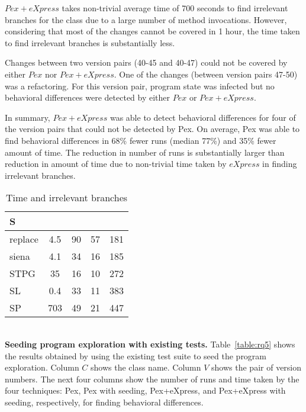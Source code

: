   $Pex+eXpress$ takes non-trivial average time of 700 seconds to find irrelevant branches for the class  due to a large number of method invocations. However, considering that most of the changes cannot be covered in 1 hour, the time taken to find irrelevant branches is substantially less. 
  
  Changes between two version pairs (40-45 and 40-47) could not be covered by either $Pex$ nor $Pex+eXpress$. One of the changes (between version pairs 47-50) was a refactoring. For this version pair, program state was infected but no behavioral differences were detected by either $Pex$ or $Pex+eXpress$.
   
  In summary, $Pex+eXpress$ was able to detect behavioral differences for four of the version pairs that could not be detected by Pex. On average, Pex was able to find behavioral differences in 68\% fewer runs (median 77\%) and 35\% fewer amount of time. 
  The reduction in number of runs is substantially larger than reduction in amount of time due to non-trivial time taken by 
  $eXpress$ in finding irrelevant branches.
\begin{table}
\begin{CodeOut}
\begin{center}
\caption {\label{table:all_time}\scriptsize{Time and irrelevant branches}}
\begin {tabular} {|l|c|c|c|c|}
\hline
S &\CenterCell{$T_{static}(s)$}&\CenterCell{$B_{E+I}$}&\CenterCell{$B_{P}$}&\CenterCell{$B_{Tot}$}\\
\hline
replace		&4.5							&90			&	57	&181\\
\hline
siena			&4.1							&34			&	16	&185\\
\hline
STPG			&35								&16			&	10	&272\\
\hline
SL				&0.4							&33			&	11	&383\\
\hline
SP				&703							&49			&	21	&447\\
\hline
\end{tabular}
\end{center}
\end{CodeOut}
\vspace{-0.5in}
\end{table}
\\ \textbf{Seeding program exploration with existing tests.} Table~\ref{table:rq5} shows the results obtained by using the existing test suite to seed the program exploration. Column $C$ shows the class name. Column $V$ shows the pair of version numbers. The next four columns show the number of runs and time taken by the four techniques: Pex, Pex with seeding, Pex+eXpress, and Pex+eXpress with seeding, respectively, for  finding behavioral differences. 
